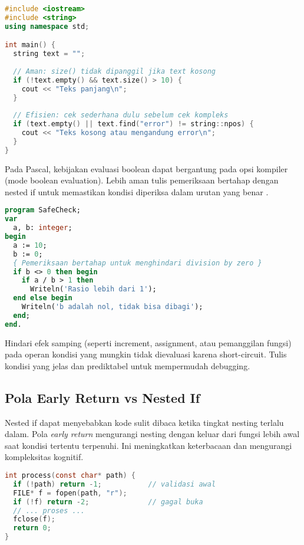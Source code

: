 \documentclass[../main.tex]{subfiles}
\begin{document}
\begin{lstlisting}[language=C++, caption={Short-circuit di C++ untuk efisiensi}]
#include <iostream>
#include <string>
using namespace std;

int main() {
  string text = "";
  
  // Aman: size() tidak dipanggil jika text kosong
  if (!text.empty() && text.size() > 10) {
    cout << "Teks panjang\n";
  }
  
  // Efisien: cek sederhana dulu sebelum cek kompleks
  if (text.empty() || text.find("error") != string::npos) {
    cout << "Teks kosong atau mengandung error\n";
  }
}
\end{lstlisting}

Pada Pascal, kebijakan evaluasi boolean dapat bergantung pada opsi kompiler (mode boolean evaluation). Lebih aman tulis pemeriksaan bertahap dengan nested if untuk memastikan kondisi diperiksa dalam urutan yang benar \parencite{free-pascal-docs}.

\begin{lstlisting}[language=Pascal, caption={Pemeriksaan bertahap di Pascal}]
program SafeCheck;
var
  a, b: integer;
begin
  a := 10;
  b := 0;
  { Pemeriksaan bertahap untuk menghindari division by zero }
  if b <> 0 then begin
    if a / b > 1 then
      Writeln('Rasio lebih dari 1');
  end else begin
    Writeln('b adalah nol, tidak bisa dibagi');
  end;
end.
\end{lstlisting}

Hindari efek samping (seperti increment, assignment, atau pemanggilan fungsi) pada operan kondisi yang mungkin tidak dievaluasi karena short-circuit. Tulis kondisi yang jelas dan prediktabel untuk mempermudah debugging.

\subsection{Pola Early Return vs Nested If}
Nested if dapat menyebabkan kode sulit dibaca ketika tingkat nesting terlalu dalam. Pola \emph{early return} mengurangi nesting dengan keluar dari fungsi lebih awal saat kondisi tertentu terpenuhi. Ini meningkatkan keterbacaan dan mengurangi kompleksitas kognitif.
\begin{lstlisting}[language=C]
int process(const char* path) {
  if (!path) return -1;           // validasi awal
  FILE* f = fopen(path, "r");
  if (!f) return -2;              // gagal buka
  // ... proses ...
  fclose(f);
  return 0;
}
\end{lstlisting}
\end{document}

